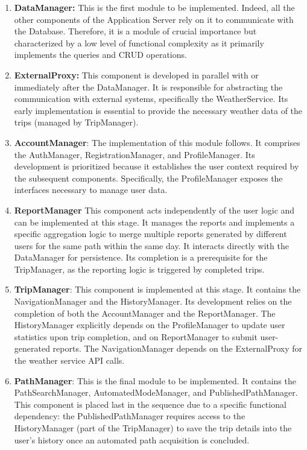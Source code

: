 \begin{enumerate}
    \item \textbf{DataManager:} This is the first module to be implemented. Indeed, all the other components of the Application Server rely on it to communicate with the Database. Therefore, it is a module of crucial importance but characterized by a low level of functional complexity as it primarily implements the queries and CRUD operations.
    
    \item \textbf{ExternalProxy:} This component is developed in parallel with or immediately after the DataManager. It is responsible for abstracting the communication with external systems, specifically the WeatherService. Its early implementation is essential to provide the necessary weather data of the trips (managed by TripManager).

    \item \textbf{AccountManager}: The implementation of this module follows. It comprises the AuthManager, RegistrationManager, and ProfileManager. Its development is prioritized because it establishes the user context required by the subsequent components. Specifically, the ProfileManager exposes the interfaces necessary to manage user data.

    \item \textbf{ReportManager} This component acts independently of the user logic and can be implemented at this stage. It manages the reports and implements a specific aggregation logic to merge multiple reports generated by different users for the same path within the same day. It interacts directly with the DataManager for persistence. Its completion is a prerequisite for the TripManager, as the reporting logic is triggered by completed trips.

    \item \textbf{TripManager}: This component is implemented at this stage. It contains the NavigationManager and the HistoryManager. Its development relies on the completion of both the AccountManager and the ReportManager. The HistoryManager explicitly depends on the ProfileManager to update user statistics upon trip completion, and on ReportManager to submit user-generated reports. The NavigationManager depends on the ExternalProxy for the weather service API calls.

    \item \textbf{PathManager}: This is the final module to be implemented. It contains the PathSearchManager, AutomatedModeManager, and PublishedPathManager.
    This component is placed last in the sequence due to a specific functional dependency: the PublishedPathManager requires access to the HistoryManager (part of the TripManager) to save the trip details into the user's history once an automated path acquisition is concluded.
\end{enumerate}

